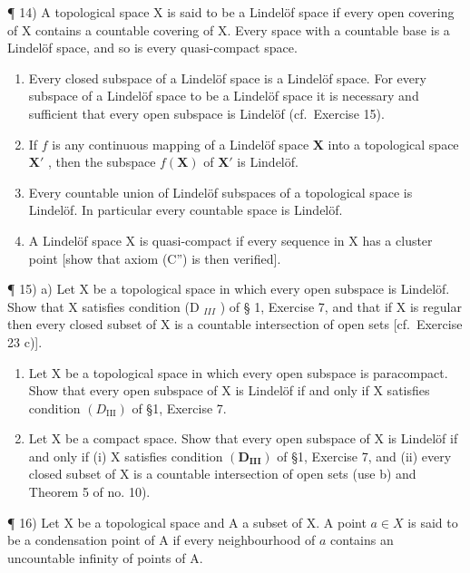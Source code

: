 ¶ 14) A topological space X is said to be a Lindelöf space if every open covering of X contains a countable covering of X. Every space with a countable base is a Lindelöf space, and so is every quasi-compact space.

\begin{enumerate}
\def\labelenumi{\alph{enumi})}
\item
  Every closed subspace of a Lindelöf space is a Lindelöf space. For every subspace of a Lindelöf space to be a Lindelöf space it is necessary and sufficient that every open subspace is Lindelöf (cf.~Exercise 15).
\item
  If \(f\) is any continuous mapping of a Lindelöf space \(\mathbf{X}\) into a topological space \(\mathbf{X}'\) , then the subspace \(f(\mathbf{X})\) of \(\mathbf{X}'\) is Lindelöf.
\item
  Every countable union of Lindelöf subspaces of a topological space is Lindelöf. In particular every countable space is Lindelöf.
\item
  A Lindelöf space X is quasi-compact if every sequence in X has a cluster point {[}show that axiom (C'') is then verified{]}.
\end{enumerate}

¶ 15) a) Let X be a topological space in which every open subspace is Lindelöf. Show that X satisfies condition (D \(_{III}\) ) of § 1, Exercise 7, and that if X is regular then every closed subset of X is a countable intersection of open sets {[}cf.~Exercise 23 c){]}.

\begin{enumerate}
\def\labelenumi{\alph{enumi})}
\setcounter{enumi}{1}
\item
  Let X be a topological space in which every open subspace is paracompact. Show that every open subspace of X is Lindelöf if and only if X satisfies condition \((D_{\mathrm{III}})\) of §1, Exercise 7.
\item
  Let X be a compact space. Show that every open subspace of X is Lindelöf if and only if (i) X satisfies condition \((\mathbf{D}_{\mathbf{III}})\) of §1, Exercise 7, and (ii) every closed subset of X is a countable intersection of open sets (use b) and Theorem 5 of no. 10).
\end{enumerate}

¶ 16) Let X be a topological space and A a subset of X. A point \(a \in X\) is said to be a condensation point of A if every neighbourhood of \(a\) contains an uncountable infinity of points of A.

